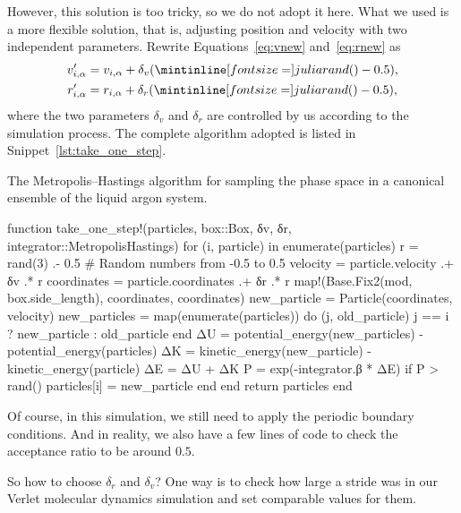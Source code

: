 However, this solution is too tricky, so we do not adopt it here.
What we used is a more flexible solution, that is, adjusting position and velocity
with two independent parameters. Rewrite Equations~\eqref{eq:vnew} and~\eqref{eq:rnew} as
%
\begin{align}
    v_{i, \alpha}' & = v_{i, \alpha} + \delta_v (\code{rand()} - 0.5), \\
    r_{i, \alpha}' & = r_{i, \alpha} + \delta_r (\code{rand()} - 0.5),
\end{align}
%
where the two parameters \(\delta_v\) and \(\delta_r\) are controlled by us according to
the simulation process. The complete algorithm adopted is listed in
Snippet~\ref{lst:take_one_step}.
%
\begin{algorithm}[H]
    \caption{The Metropolis--Hastings algorithm for sampling the phase space in a canonical
        ensemble of the liquid argon system.}
    \label{lst:take_one_step}
    \begin{juliacode}
        function take_one_step!(particles, box::Box, δv, δr, integrator::MetropolisHastings)
            for (i, particle) in enumerate(particles)
                r = rand(3) .- 0.5  # Random numbers from -0.5 to 0.5
                velocity = particle.velocity .+ δv .* r
                coordinates = particle.coordinates .+ δr .* r
                map!(Base.Fix2(mod, box.side_length), coordinates, coordinates)
                new_particle = Particle(coordinates, velocity)
                new_particles = map(enumerate(particles)) do (j, old_particle)
                    j == i ? new_particle : old_particle
                end
                ΔU = potential_energy(new_particles) - potential_energy(particles)
                ΔK = kinetic_energy(new_particle) - kinetic_energy(particle)
                ΔE = ΔU + ΔK
                P = exp(-integrator.β * ΔE)
                if P > rand()
                    particles[i] = new_particle
                end
            end
            return particles
        end
    \end{juliacode}
\end{algorithm}
%
Of course, in this simulation, we still need to apply the periodic boundary conditions.
And in reality, we also have a few lines of code to check the acceptance ratio to be
around \(0.5\).

So how to choose \(\delta_r\) and \(\delta_v\)? One way is to check how large
a stride was in our Verlet molecular dynamics simulation and set comparable values
for them.

